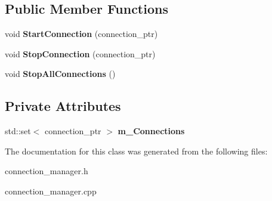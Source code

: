 \subsection*{\-Public \-Member \-Functions}
\begin{DoxyCompactItemize}
\item 
\hypertarget{classhttp__server_1_1cConnectionManager_ab7741005e29b740894addaded7a17ee2}{
void {\bfseries \-Start\-Connection} (connection\-\_\-ptr)}
\label{classhttp__server_1_1cConnectionManager_ab7741005e29b740894addaded7a17ee2}

\item 
\hypertarget{classhttp__server_1_1cConnectionManager_a740f1202cf4db1493aac3c8f0a99bbb4}{
void {\bfseries \-Stop\-Connection} (connection\-\_\-ptr)}
\label{classhttp__server_1_1cConnectionManager_a740f1202cf4db1493aac3c8f0a99bbb4}

\item 
\hypertarget{classhttp__server_1_1cConnectionManager_a5dddb041d33c7bbb4220deaa9dd74b3c}{
void {\bfseries \-Stop\-All\-Connections} ()}
\label{classhttp__server_1_1cConnectionManager_a5dddb041d33c7bbb4220deaa9dd74b3c}

\end{DoxyCompactItemize}
\subsection*{\-Private \-Attributes}
\begin{DoxyCompactItemize}
\item 
\hypertarget{classhttp__server_1_1cConnectionManager_a6bc3632311d979511b8393d611b88752}{
std\-::set$<$ connection\-\_\-ptr $>$ {\bfseries m\-\_\-\-Connections}}
\label{classhttp__server_1_1cConnectionManager_a6bc3632311d979511b8393d611b88752}

\end{DoxyCompactItemize}


\-The documentation for this class was generated from the following files\-:\begin{DoxyCompactItemize}
\item 
connection\-\_\-manager.\-h\item 
connection\-\_\-manager.\-cpp\end{DoxyCompactItemize}
